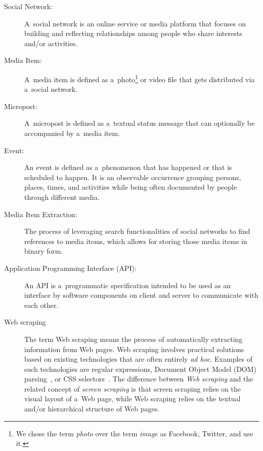 \begin{description}
  \item[Social Network:]
       A~social network is an online service or media platform
       that focuses on building and reflecting
       relationships among people
       who share interests and/or activities.
  \item[Media Item:]
       A~media item is defined as
       a~photo\footnote{We chose the term \emph{photo}
       over the term \emph{image} as 
       Facebook, Twitter, and \googleplus use it.}
       or video
       file that gets distributed via a~social network.
  \item[Micropost:]
       A~micropost is defined as a~textual status message
       that can optionally be accompanied by a~media item.
  \item[Event:]
       An event is defined as a~phenomenon that has happened
       or that is scheduled to happen.
       It is an observable occurrence grouping persons,
       places, times, and activities while being often
       documented by people through different media.
  \item[Media Item Extraction:]
       The process of leveraging search functionalities of
       social networks to find references to media items,
       which allows for storing those media items in binary form.       
  \item[Application Programming Interface (API):]
       An API is a~programmatic specification intended to be used
       as an interface by software components on client and server
       to communicate with each other.
  \item[Web scraping]
       The term Web scraping means the process of
       automatically extracting information from Web pages.
       Web scraping involves practical solutions based on
       existing technologies that are often entirely \emph{ad hoc}.
       Examples of such technologies are regular expressions,
       Document Object Model (DOM)
       parsing~\cite{lehors2004dom},
       or CSS selectors~\cite{hunt2012cssselectors}.
       The difference between \emph{Web scraping}
       and the related concept of \emph{screen scraping}
       is that screen scraping relies on the visual layout of a~Web page,
       while Web scraping relies on the textual
       and/or hierarchical structure of Web pages.
\end{description}

